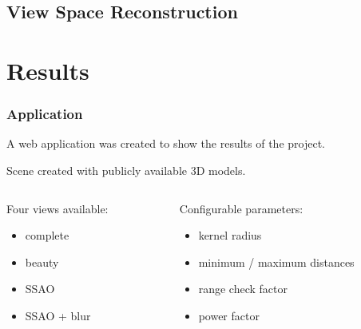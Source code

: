 \documentclass{beamer}
\begin{document}
\subsection{View Space Reconstruction}

\section{Results}

\begin{frame}
\frametitle{Application}
A web application was created to show the results of the project.

Scene created with publicly available 3D models.
\vspace{0.6cm}
\begin{columns}
    \begin{column}[t]{0.45\linewidth}
        Four views available:
        \begin{itemize}
            \item complete
            \item beauty
            \item SSAO
            \item SSAO + blur
        \end{itemize}
    \end{column}

    \begin{column}[t]{0.45\linewidth}
        Configurable parameters:
        \begin{itemize}
            \item kernel radius
            \item minimum / maximum distances
            \item range check factor
            \item power factor
        \end{itemize}
    \end{column}

\end{columns}

\end{frame}

\newcommand{\resultwidth}{0.9\linewidth}
\end{document}
